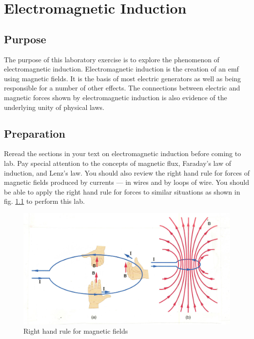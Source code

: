 \chapter{Electromagnetic Induction}

\section{Purpose}
The purpose of this laboratory exercise is to explore the phenomenon of electromagnetic induction.  Electromagnetic induction is the creation of an emf using magnetic fields.  It is the basis of most electric generators as well as being responsible for a number of other effects.  The connections between electric and magnetic forces shown by electromagnetic induction is also evidence of the underlying unity of physical laws.

\section{Preparation}
Reread the sections in your text on electromagnetic induction before coming to lab. Pay special attention to the concepts of magnetic flux, Faraday's law of induction, and Lenz's law.  You should also review the \textsf{right hand rule for forces} of magnetic fields produced by currents --- in wires and by loops of wire.  You should be able to apply the \textsf{right hand rule for forces} to similar situations as shown in fig. \ref{f:fig11} to perform this lab.


\begin{figure}[hbt]
	\centering
	\includegraphics[scale=0.6]{5bgraf/fig_11}
	\caption{Right hand rule for magnetic fields}
	\label{f:fig11}
\end{figure}


